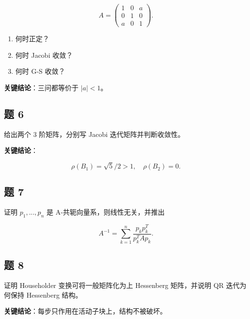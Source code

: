 \documentclass[11pt,a4paper]{ctexart}
\begin{document}

\[
A=\begin{pmatrix}1&0&a\\0&1&0\\a&0&1\end{pmatrix}.
\]

\begin{enumerate}

\item 何时正定？

\item 何时 Jacobi 收敛？

\item 何时 G-S 收敛？

\end{enumerate}

\textbf{关键结论}：三问都等价于 $|a|<1$。


\subsection*{题 6}


给出两个 3 阶矩阵，分别写 Jacobi 迭代矩阵并判断收敛性。

\textbf{关键结论}：

\[
\rho(B_1)=\sqrt5/2>1,\quad \rho(B_2)=0.
\]


\subsection*{题 7}


证明 $p_1,...,p_n$ 是 A-共轭向量系，则线性无关，并推出

\[
A^{-1}=\sum_{k=1}^n\frac{p_kp_k^T}{p_k^TAp_k}.
\]


\subsection*{题 8}


证明 Householder 变换可将一般矩阵化为上 Hessenberg 矩阵，并说明 QR 迭代为何保持 Hessenberg 结构。

\textbf{关键结论}：每步只作用在活动子块上，结构不被破坏。
\end{document}
